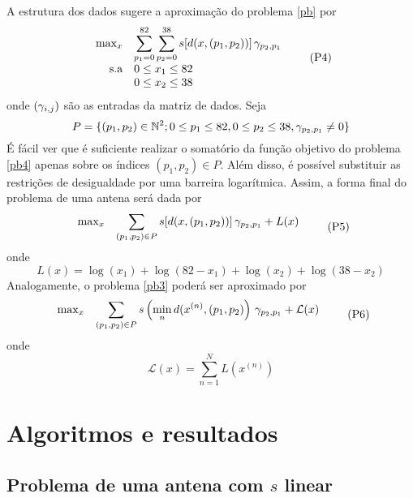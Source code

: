 \documentclass[a4paper,12pt]{article}
\begin{document}
A estrutura dos dados sugere a aproximação do problema \eqref{pb} por
\begin{equation}
	\label{pb4}
	\begin{array}{rl}
		\max_{x} & \displaystyle\sum\limits_{p_1=0}^{82} \sum\limits_{p_2=0}^{38} s[d(x,(p_1,p_2))] \, \gamma_{p_2,p_1} \\[2.5ex]
		\text{s.a} & 0 \leq x_1 \leq 82 \\
		& 0 \leq x_2 \leq 38
	\end{array}
	\tag{P4}
\end{equation}
onde $(\gamma_{i,j})$ são as entradas da matriz de dados. Seja
\begin{equation*}
	P = \{ (p_1,p_2) \in \mathbb{N}^2 ; 0 \leq p_1 \leq 82, 0 \leq p_2 \leq 38, \gamma_{p_2,p_1} \neq 0\}
\end{equation*}
É fácil ver que é suficiente realizar o somatório da função objetivo do problema \eqref{pb4} apenas sobre os índices $(p_1,p_2) \in P$. Além disso, é possível substituir as restrições de desigualdade por uma barreira logarítmica. Assim, a forma final do problema de uma antena será dada por
\begin{equation}
	\label{pb5}
	\begin{array}{rl}
		\max_{x} & \displaystyle\sum\limits_{(p_1,p_2) \in P} s[d(x,(p_1,p_2))] \, \gamma_{p_2,p_1} + L(x)
	\end{array}
	\tag{P5}
\end{equation}
onde
\begin{equation*}
	L(x) = \log(x_1) + \log(82 - x_1) + \log(x_2) + \log(38 - x_2)
\end{equation*}
Analogamente, o problema \eqref{pb3} poderá ser aproximado por
\begin{equation}
	\label{pb6}
	\begin{array}{rl}
		\max_{x} & \displaystyle\sum\limits_{(p_1,p_2) \in P} s\left( \min_n d(x^{(n)},(p_1,p_2) \right) \, \gamma_{p_2,p_1} + \mathcal{L}(x)
	\end{array}
	\tag{P6}
\end{equation}
onde 
\begin{equation*}
	\mathcal{L}(x) = \sum\limits_{n=1}^N L\left(x^{(n)}\right)
\end{equation*}

\section{Algoritmos e resultados}

\subsection{Problema de uma antena com $s$ linear}
\end{document}
